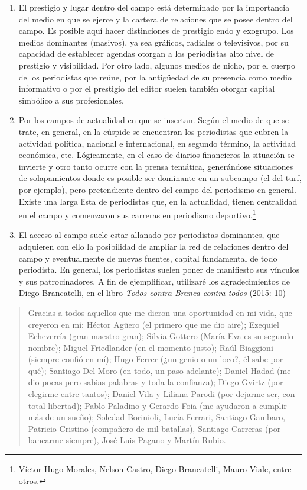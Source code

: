 \begin{enumerate}
\def\labelenumi{\alph{enumi})}
\setcounter{enumi}{1}
\item
  El prestigio y lugar dentro del campo está determinado por la importancia del medio en que se ejerce y la cartera de relaciones que se posee dentro del campo. Es posible aquí hacer distinciones de prestigio endo y exogrupo. Los medios dominantes (masivos), ya sea gráficos, radiales o televisivos, por su capacidad de establecer agendas otorgan a los periodistas alto nivel de prestigio y visibilidad. Por otro lado, algunos medios de nicho, por el cuerpo de los periodistas que reúne, por la antigüedad de su presencia como medio informativo o por el prestigio del editor suelen también otorgar capital simbólico a sus profesionales.
\item
  Por los campos de actualidad en que se insertan. Según el medio de que se trate, en general, en la cúspide se encuentran los periodistas que cubren la actividad política, nacional e internacional, en segundo término, la actividad económica, etc. Lógicamente, en el caso de diarios financieros la situación se invierte y otro tanto ocurre con la prensa temática, generándose situaciones de solapamientos donde es posible ser dominante en un subcampo (el del turf, por ejemplo), pero pretendiente dentro del campo del periodismo en general. Existe una larga lista de periodistas que, en la actualidad, tienen centralidad en el campo y comenzaron sus carreras en periodismo deportivo.\footnote{Víctor Hugo Morales, Nelson Castro, Diego Brancatelli, Mauro Viale, entre otros.}
\item
  El acceso al campo suele estar allanado por periodistas dominantes, que adquieren con ello la posibilidad de ampliar la red de relaciones dentro del campo y eventualmente de nuevas fuentes, capital fundamental de todo periodista. En general, los periodistas suelen poner de manifiesto sus vínculos y sus patrocinadores. A fin de ejemplificar, utilizaré los agradecimientos de Diego Brancatelli, en el libro \emph{Todos contra Branca contra todos} (2015: 10)
\end{enumerate}

\begin{quote}
Gracias a todos aquellos que me dieron una oportunidad en mi vida, que creyeron en mí: Héctor Agüero (el primero que me dio aire); Ezequiel Echeverría (gran maestro gran); Silvia Gottero (María Eva es su segundo nombre); Miguel Friedlander (en el momento justo); Raúl Biaggioni (siempre confió en mí); Hugo Ferrer (¿un genio o un loco?, él sabe por qué); Santiago Del Moro (en todo, un paso adelante); Daniel Hadad (me dio pocas pero sabias palabras y toda la confianza); Diego Gvirtz (por elegirme entre tantos); Daniel Vila y Liliana Parodi (por dejarme ser, con total libertad); Pablo Paladino y Gerardo Foia (me ayudaron a cumplir más de un sueño); Soledad Borinioli, Lucía Ferrari, Santiago Gambaro, Patricio Cristino (compañero de mil batallas), Santiago Carreras (por bancarme siempre), José Luis Pagano y Martín Rubio.
\end{quote}

